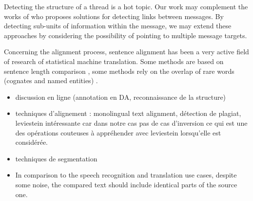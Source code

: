 Detecting the structure of a thread is a hot topic. Our work may complement the works of \cite{li:2011:threadlinking,kim:2010:taggingandlinking} who proposes solutions for detecting links between messages. 
By detecting sub-units of information within the message, we may extend these approaches by considering the possibility of pointing to multiple message targets.

Concerning the alignment process, sentence alignment has been a very active field of research of statistical machine translation. 
Some methods are based on sentence length comparison \cite{gale:1991}, some methods rely on the overlap of rare words (cognates and named entities) \cite{enright-kondrak:2007:ShortPapers}.




\begin{itemize}
\item discussion en ligne (annotation en DA, reconnaissance de la structure)
\item  techniques d'alignement : monolingual text alignment, détection de plagiat, leviestein intéressante car dans notre cas pas de cas d'inversion ce qui est une des opérations couteuses à appréhender avec leviestein lorsqu'elle est considérée.


\item  techniques de segmentation
\item In comparison to the speech recognition and translation use cases, despite some noise, the compared text should include identical parts of the source one.

\end{itemize}

